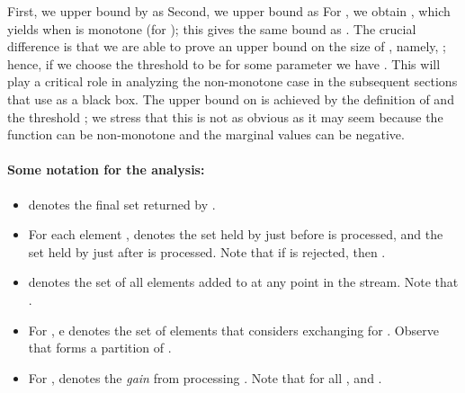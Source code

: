 \documentclass[oneside,letterpaper]{scrartcl} \usepackage{macros}
\begin{document}
First, we upper bound  by  as 
Second, we upper bound  as 
For , we obtain , which yields  when  is monotone (for ); this gives
the same bound as \cite{ck-smms-14}.  The crucial difference is that
we are able to prove an upper bound on the size of , namely,
; hence, if we choose the threshold
 to be  for some parameter  we have . This will play a critical role in analyzing the non-monotone
case in the subsequent sections that use 
as a black box. The upper bound on  is achieved by the definition
of  and the threshold ; we stress that this is not
as obvious as it may seem because the function  can be non-monotone
and the marginal values can be negative.



\iffalse In the preceding literature for similar offline algorithms, a
competing independent set  is typically compared
directly to the output set . In the offline case, the
elements of  and the elements of  are evaluated in the
same view, and the algorithm's decision to take an element in
 over an element in  speaks to their relative
values. Such direct comparisons between  and  are
unavailable in the streaming setting, where an element in  may be
rejected long before any element in  has appeared, with no
direct comparison ever made.

Instead, we try to relate  to  by way of the set
. First, in \refsection{takens-vs-final-set}, we bound  (hiding dependencies on ). Then, in
\refsection{takens-and-competition-vs-takens}, we bound  (hiding dependencies on ,
, and the rank of ). Together, these two
inequalities bound  by . If  is
monotone, then , so in
\refsection{monotone-competition-vs-final-set}, we combine the two
relations to bound  by .  \fi

\paragraph{Some notation for the analysis:}
\begin{itemize}
\item  denotes the final set returned by
  .
\item For each element ,  denotes the
  set held by  just before  is processed, and  the
  set held by  just after  is processed. Note that if  is
  rejected, then .
\item  denotes the set of all elements added to  at any
  point in the stream. Note that .
\item For , e denotes the set of elements that
   considers exchanging for . Observe
  that  forms a
  partition of .
\item For ,  denotes the {\em gain} from processing . Note
  that  for all ,
  and .
\end{itemize}
\end{document}
